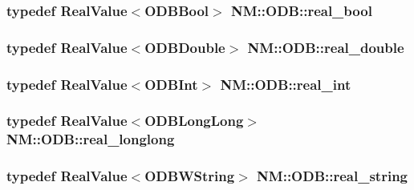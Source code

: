 \subsubsection[{real\+\_\+bool}]{\setlength{\rightskip}{0pt plus 5cm}typedef {\bf Real\+Value}$<${\bf O\+D\+B\+Bool}$>$ {\bf N\+M\+::\+O\+D\+B\+::real\+\_\+bool}}\label{namespace_n_m_1_1_o_d_b_a35501430d0cd9713ef5d32a79e4f546e}
\hypertarget{namespace_n_m_1_1_o_d_b_a7ac7e14198555160d04917c61d489cd0}{}
\subsubsection[{real\+\_\+double}]{\setlength{\rightskip}{0pt plus 5cm}typedef {\bf Real\+Value}$<${\bf O\+D\+B\+Double}$>$ {\bf N\+M\+::\+O\+D\+B\+::real\+\_\+double}}\label{namespace_n_m_1_1_o_d_b_a7ac7e14198555160d04917c61d489cd0}
\hypertarget{namespace_n_m_1_1_o_d_b_a26974c6ae050437cf6dd2c7e680e9f31}{}
\subsubsection[{real\+\_\+int}]{\setlength{\rightskip}{0pt plus 5cm}typedef {\bf Real\+Value}$<${\bf O\+D\+B\+Int}$>$ {\bf N\+M\+::\+O\+D\+B\+::real\+\_\+int}}\label{namespace_n_m_1_1_o_d_b_a26974c6ae050437cf6dd2c7e680e9f31}
\hypertarget{namespace_n_m_1_1_o_d_b_afd47e24435091d2bb616b270d5e70f56}{}
\subsubsection[{real\+\_\+longlong}]{\setlength{\rightskip}{0pt plus 5cm}typedef {\bf Real\+Value}$<${\bf O\+D\+B\+Long\+Long}$>$ {\bf N\+M\+::\+O\+D\+B\+::real\+\_\+longlong}}\label{namespace_n_m_1_1_o_d_b_afd47e24435091d2bb616b270d5e70f56}
\hypertarget{namespace_n_m_1_1_o_d_b_a1253623839775f675b83137b1b1d2eea}{}
\subsubsection[{real\+\_\+string}]{\setlength{\rightskip}{0pt plus 5cm}typedef {\bf Real\+Value}$<${\bf O\+D\+B\+W\+String}$>$ {\bf N\+M\+::\+O\+D\+B\+::real\+\_\+string}}\label{namespace_n_m_1_1_o_d_b_a1253623839775f675b83137b1b1d2eea}
\hypertarget{namespace_n_m_1_1_o_d_b_a76ab348a70a5cf877035b8281bdd3f7b}{}
